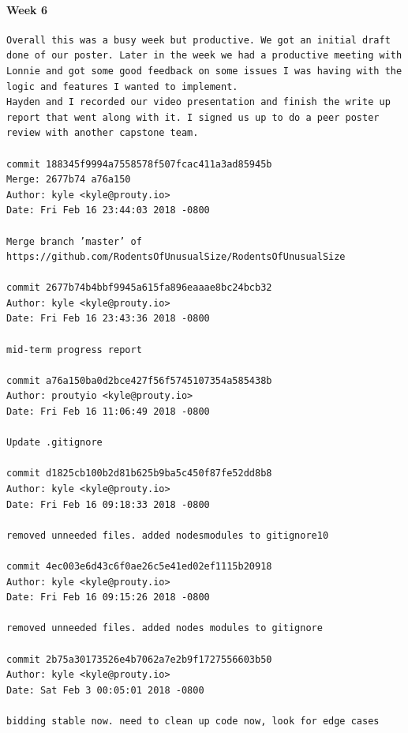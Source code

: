 \documentclass[draftclsnofoot, onecolumn, compsoc, 10pt]{IEEEtran}
\begin{document}
\paragraph{Week 6}
\begin{lstlisting}
Overall this was a busy week but productive. We got an initial draft done of our poster. Later in the week we had a productive meeting with Lonnie and got some good feedback on some issues I was having with the logic and features I wanted to implement.  
Hayden and I recorded our video presentation and finish the write up report that went along with it. I signed us up to do a peer poster review with another capstone team. 

commit 188345f9994a7558578f507fcac411a3ad85945b 
Merge: 2677b74 a76a150 
Author: kyle <kyle@prouty.io> 
Date: Fri Feb 16 23:44:03 2018 -0800 

Merge branch ’master’ of https://github.com/RodentsOfUnusualSize/RodentsOfUnusualSize 

commit 2677b74b4bbf9945a615fa896eaaae8bc24bcb32 
Author: kyle <kyle@prouty.io> 
Date: Fri Feb 16 23:43:36 2018 -0800 

mid-term progress report 

commit a76a150ba0d2bce427f56f5745107354a585438b 
Author: proutyio <kyle@prouty.io> 
Date: Fri Feb 16 11:06:49 2018 -0800 

Update .gitignore 

commit d1825cb100b2d81b625b9ba5c450f87fe52dd8b8 
Author: kyle <kyle@prouty.io> 
Date: Fri Feb 16 09:18:33 2018 -0800 

removed unneeded files. added nodesmodules to gitignore10 

commit 4ec003e6d43c6f0ae26c5e41ed02ef1115b20918 
Author: kyle <kyle@prouty.io> 
Date: Fri Feb 16 09:15:26 2018 -0800 

removed unneeded files. added nodes modules to gitignore 

commit 2b75a30173526e4b7062a7e2b9f1727556603b50 
Author: kyle <kyle@prouty.io> 
Date: Sat Feb 3 00:05:01 2018 -0800 

bidding stable now. need to clean up code now, look for edge cases 
\end{lstlisting}
\end{document}
